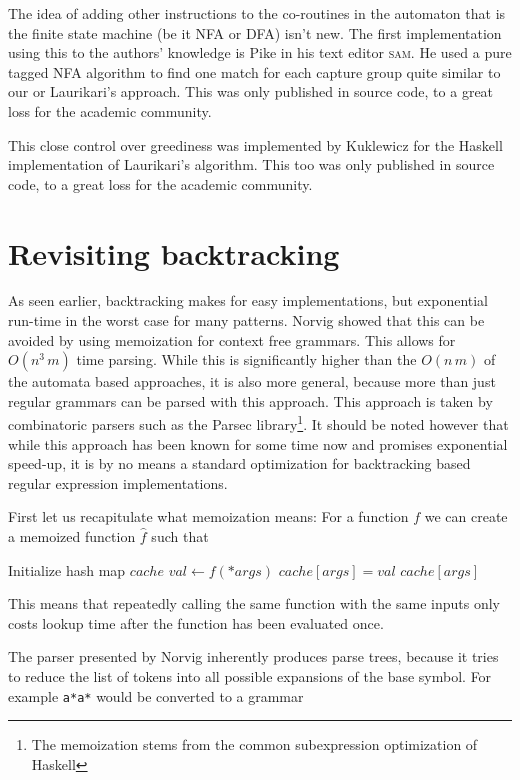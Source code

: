 \documentclass[11pt,a4paper,twoside,openright]{Thesis}
\theoremstyle{definition}
\newcommand{\seclabel}[1]{\label{sec:#1}}
\begin{document}
The idea of adding other instructions to the co-routines in the automaton
that is the finite state machine (be it NFA or DFA) isn't new. The first
implementation using this to the authors' knowledge is Pike\cite{Pike87a} in
his text editor \textsc{sam}. He used a pure tagged NFA algorithm to find one
match for each capture group quite similar to our or Laurikari's approach. This
was only published in source code, to a great loss for the academic community.

This close control over greediness was implemented by Kuklewicz\cite{Kukl07a}
for the Haskell implementation of Laurikari's algorithm. This too was only
published in source code, to a great loss for the academic community.

\section{Revisiting backtracking}\seclabel{revise-backtrack}
As seen earlier, backtracking makes for easy implementations, but exponential
run-time in the worst case for many patterns. Norvig\cite{Norv91a} showed that
this can be avoided by using memoization for context free grammars.  This
allows for $O(n^3\, m)$ time parsing. While this is significantly higher than
the $O(n\, m)$ of the automata based approaches, it is also more general,
because more than just regular grammars can be parsed with this approach.  This
approach is taken by combinatoric parsers such as the Parsec
library\footnote{The memoization stems from the common subexpression
optimization of Haskell}.  It should be noted however that while this
approach has been known for some time now and promises exponential
speed-up, it is by no means a standard optimization for backtracking based
regular expression implementations.

First let us recapitulate what memoization means: For a function $f$ we can
create a memoized function $\hat f$ such that
\begin{algorithmic}
  \State Initialize hash map $cache$
  \State $val\leftarrow f(*args)$
  \State $cache[args] = val$
  \EndIf
  \State \Return $cache[args]$
  \EndFunction
\end{algorithmic}
This means that repeatedly calling the same function with  the same inputs
only costs lookup time after the function has been evaluated once.

The parser presented by Norvig inherently produces parse trees, because it
tries to reduce the list of tokens into all possible expansions of the base
symbol. For example \texttt{a*a*} would be converted to a grammar
\end{document}
